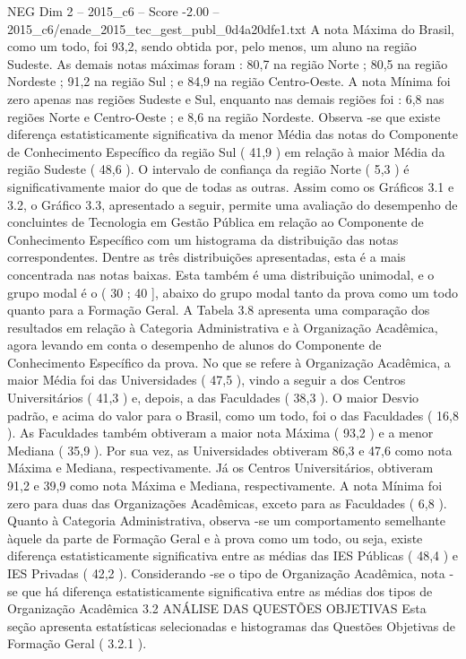 \begin{textsample}{NEG Dim 2 – 2015\_c6 – Score -2.00 – 2015\_c6/enade\_2015\_tec\_gest\_publ\_0d4a20dfe1.txt}
A nota Máxima do Brasil, como um todo, foi 93,2, sendo obtida por, pelo menos, um aluno na região Sudeste.
As demais notas máximas foram : 80,7 na região Norte ; 80,5 na região Nordeste ; 91,2 na região Sul ; e 84,9 na região Centro-Oeste.
A nota Mínima foi zero apenas nas regiões Sudeste e Sul, enquanto nas demais regiões foi : 6,8 nas regiões Norte e Centro-Oeste ; e 8,6 na região Nordeste.
Observa -se que existe diferença estatisticamente significativa da menor Média das notas do Componente de Conhecimento Específico da região Sul ( 41,9 ) em relação à maior Média da região Sudeste ( 48,6 ).
O intervalo de confiança da região Norte ( 5,3 ) é significativamente maior do que de todas as outras.
Assim como os Gráficos 3.1 e 3.2, o Gráfico 3.3, apresentado a seguir, permite uma avaliação do desempenho de concluintes de Tecnologia em Gestão Pública em relação ao Componente de Conhecimento Específico com um histograma da distribuição das notas correspondentes.
Dentre as três distribuições apresentadas, esta é a mais concentrada nas notas baixas.
Esta também é uma distribuição unimodal, e o grupo modal é o ( 30 ; 40 ], abaixo do grupo modal tanto da prova como um todo quanto para a Formação Geral.
A Tabela 3.8 apresenta uma comparação dos resultados em relação à Categoria Administrativa e à Organização Acadêmica, agora levando em conta o desempenho de alunos do Componente de Conhecimento Específico da prova.
No que se refere à Organização Acadêmica, a maior Média foi das Universidades ( 47,5 ), vindo a seguir a dos Centros Universitários ( 41,3 ) e, depois, a das Faculdades ( 38,3 ).
O maior Desvio padrão, e acima do valor para o Brasil, como um todo, foi o das Faculdades ( 16,8 ).
As Faculdades também obtiveram a maior nota Máxima ( 93,2 ) e a menor Mediana ( 35,9 ).
Por sua vez, as Universidades obtiveram 86,3 e 47,6 como nota Máxima e Mediana, respectivamente.
Já os Centros Universitários, obtiveram 91,2 e 39,9 como nota Máxima e Mediana, respectivamente.
A nota Mínima foi zero para duas das Organizações Acadêmicas, exceto para as Faculdades ( 6,8 ).
Quanto à Categoria Administrativa, observa -se um comportamento semelhante àquele da parte de Formação Geral e à prova como um todo, ou seja, existe diferença estatisticamente significativa entre as médias das IES Públicas ( 48,4 ) e IES Privadas ( 42,2 ).
Considerando -se o tipo de Organização Acadêmica, nota -se que há diferença estatisticamente significativa entre as médias dos tipos de Organização Acadêmica 3.2 ANÁLISE DAS QUESTÕES OBJETIVAS Esta seção apresenta estatísticas selecionadas e histogramas das Questões Objetivas de Formação Geral ( 3.2.1 ).

\end{textsample}
